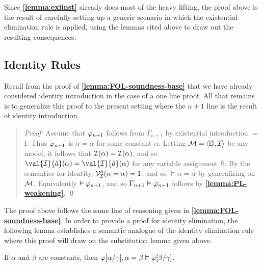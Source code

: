 Since \textbf{\ref{lemma:exiinst}} already does most of the heavy lifting, the proof above is the result of carefully setting up a generic scenario in which the existential elimination rule is applied, using the lemmas cited above to draw out the resulting consequences.



\subsection{Identity Rules}%
  \label{sub:IdentityRules}

Recall from the proof of \textbf{\ref{lemma:FOL-soundness-base}} that we have already considered identity introduction in the case of a one line proof.
All that remains is to generalize this proof to the present setting where the $n+1$ line is the result of identity introduction. 
  


\begin{quote} 
  \textit{Proof:} Assume that $\varphi_{n+1}$ follows from $\Gamma_{n+1}$ by existential introduction $=$I.
  Thus $\varphi_{n+1}$ is $\alpha=\alpha$ for some constant $\alpha$. 
  Letting $\mathcal{M}=\langle\mathbb{D},\mathcal{I}\rangle$ be any model, it follows that $\mathcal{I}(\alpha)=\mathcal{I}(\alpha)$, and so $\val{\I}{\va{a}}(\alpha)=\val{\I}{\va{a}}(\alpha)$ for any variable assignment $\hat{a}$.
  By the semantics for identity, $\mathcal{V}_{\mathcal{I}}^{\hat{a}}(\alpha=\alpha)=1$, and so $\vDash \alpha=\alpha$ by generalizing on $\mathcal{M}$.
  Equivalently $\vDash \varphi_{n+1}$, and so $\Gamma_{n+1}\vDash\varphi_{n+1}$ follows by \textbf{\ref{lemma:PL-weakening}}.
  \qed
\end{quote}

The proof above follows the same line of reasoning given in \textbf{\ref{lemma:FOL-soundness-base}}.
In order to provide a proof for identity elimination, the following lemma establishes a semantic analogue of the identity elimination rule where this proof will draw on the substitution lemma given above.




\begin{Lthm} \label{lemma:id}
  If $\alpha$ and $\beta$ are constants, then $\varphi[\alpha/\gamma], \alpha = \beta \vDash \varphi[\beta/\gamma]$.
\end{Lthm}

